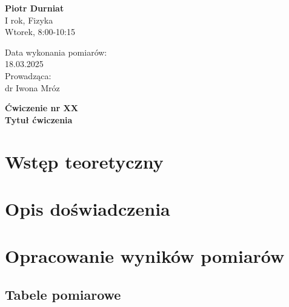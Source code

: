 \documentclass[a4paper,12pt]{article}
\begin{document}
\noindent
\begin{minipage}{0.5\textwidth}
    \raggedright
    \textbf{Piotr Durniat} \\
    I rok, Fizyka \\
    Wtorek, 8:00-10:15 \\
    \vspace{0.5cm}
    \vspace{0.5cm}
\end{minipage}%
\begin{minipage}{0.5\textwidth}
    \raggedleft
    Data wykonania pomiarów: \\
    18.03.2025 \\
    \vspace{0.5cm} %
    Prowadząca: \\
    dr Iwona Mróz
\end{minipage}

\vspace{2cm} %
\begin{center}
    \LARGE \textbf{Ćwiczenie nr XX} \\[0.5cm]
    \Large \textbf{Tytuł ćwiczenia}
\end{center}

\vspace{1cm} %
\noindent

\tableofcontents
\newpage

\section{Wstęp teoretyczny}

\section{Opis doświadczenia}

\section{Opracowanie wyników pomiarów}

\subsection{Tabele pomiarowe}
\end{document}
